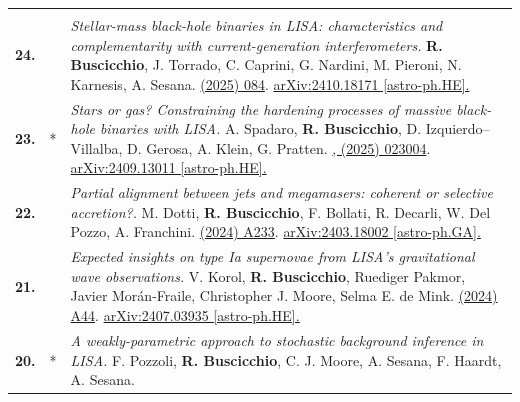 {\begin{longtable}{rp{0.3cm}p{15.8cm}}
\vspace{0.09cm}\\
%
\textbf{24.} & & \textit{Stellar-mass black-hole binaries in LISA: characteristics and complementarity with current-generation interferometers.}
\newline{}
\textbf{R. Buscicchio}, J. Torrado, C. Caprini, G. Nardini, M. Pieroni, N. Karnesis, A. Sesana.
\newline{}
\href{https://doi.org/10.1088/1475-7516/2025/01/084}{\jcap 01 (2025) 084}. \href{https://arxiv.org/abs/2410.18171}{arXiv:2410.18171 [astro-ph.HE].}
\vspace{0.09cm}\\
%
\textbf{23.} & * & \textit{Stars or gas? Constraining the hardening processes of massive black-hole binaries with LISA.}
\newline{}
A. Spadaro, \textbf{R. Buscicchio}, D. Izquierdo--Villalba, D. Gerosa, A. Klein, G. Pratten.
\newline{}
\href{https://doi.org/10.1103/PhysRevD.111.023004}{\prd 111, (2025) 023004}. \href{https://arxiv.org/abs/2409.13011}{arXiv:2409.13011 [astro-ph.HE].}
\vspace{0.09cm}\\
%
\textbf{22.} & & \textit{Partial alignment between jets and megamasers: coherent or selective accretion?.}
\newline{}
M. Dotti, \textbf{R. Buscicchio}, F. Bollati, R. Decarli, W. Del Pozzo, A. Franchini.
\newline{}
\href{https://doi.org/10.1051/0004-6361/202450112}{\aap 692 (2024) A233}. \href{https://arxiv.org/abs/2403.18002}{arXiv:2403.18002 [astro-ph.GA].}
\vspace{0.09cm}\\
%
\textbf{21.} & & \textit{Expected insights on type Ia supernovae from LISA's gravitational wave observations.}
\newline{}
V. Korol, \textbf{R. Buscicchio}, Ruediger Pakmor, Javier Morán-Fraile, Christopher J. Moore, Selma E. de Mink.
\newline{}
\href{https://www.aanda.org/articles/aa/full_html/2024/11/aa51380-24/aa51380-24.html}{\aap 691 (2024) A44}. \href{https://arxiv.org/abs/2407.03935}{arXiv:2407.03935 [astro-ph.HE].}
\vspace{0.09cm}\\
%
\textbf{20.} & * & \textit{A weakly-parametric approach to stochastic background inference in LISA.}
\newline{}
F. Pozzoli, \textbf{R. Buscicchio}, C. J. Moore, A. Sesana, F. Haardt, A. Sesana.

\end{longtable}}
